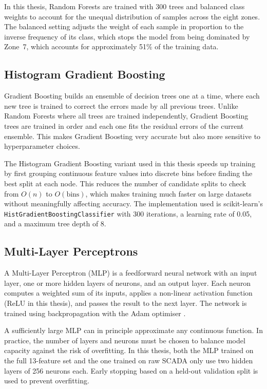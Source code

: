 In this thesis, Random Forests are trained with 300 trees and balanced class weights to
account for the unequal distribution of samples across the eight zones. The balanced
setting adjusts the weight of each sample in proportion to the inverse frequency of its
class, which stops the model from being dominated by Zone~7, which accounts for
approximately 51\% of the training data.

\subsection{Histogram Gradient Boosting}
\label{subsec:bg:gbt}

Gradient Boosting \citep{friedman2001} builds an ensemble of decision trees one at a
time, where each new tree is trained to correct the errors made by all previous trees.
Unlike Random Forests where all trees are trained independently, Gradient Boosting trees
are trained in order and each one fits the residual errors of the current ensemble. This
makes Gradient Boosting very accurate but also more sensitive to hyperparameter choices.

The Histogram Gradient Boosting variant used in this thesis speeds up training by first
grouping continuous feature values into discrete bins before finding the best split at
each node. This reduces the number of candidate splits to check from $O(n)$ to
$O(\text{bins})$, which makes training much faster on large datasets without meaningfully
affecting accuracy. The implementation used is scikit-learn's
\texttt{HistGradientBoostingClassifier} with 300 iterations, a learning rate of 0.05,
and a maximum tree depth of 8.

\subsection{Multi-Layer Perceptrons}
\label{subsec:bg:mlp}

A Multi-Layer Perceptron (MLP) is a feedforward neural network with an input layer, one
or more hidden layers of neurons, and an output layer. Each neuron computes a weighted
sum of its inputs, applies a non-linear activation function (ReLU in this thesis), and
passes the result to the next layer. The network is trained using backpropagation with
the Adam optimiser \citep{kingma2014}.

A sufficiently large MLP can in principle approximate any continuous function. In
practice, the number of layers and neurons must be chosen to balance model capacity
against the risk of overfitting. In this thesis, both the MLP trained on the full
13-feature set and the one trained on raw SCADA only use two hidden layers of 256 neurons
each. Early stopping based on a held-out validation split is used to prevent overfitting.

